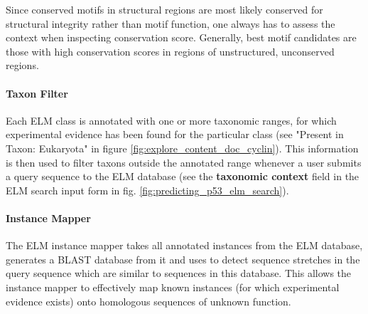 \documentclass[12pt]{article}
\newcommand\button[1]{%
	\textbf{#1}%
}
\begin{document}
Since conserved motifs in structural regions are most likely conserved for
structural integrity rather than motif function, one always has to assess the
context when inspecting conservation score. Generally, best motif candidates
are those with high conservation scores in regions of unstructured, unconserved
regions.

%

\paragraph*{Taxon Filter}\label{TaxonFilter}

Each ELM class is annotated with one or more taxonomic ranges, for which
experimental evidence has been found for the particular class
(see "Present in Taxon: Eukaryota" in figure
\ref{fig:explore_content_doc_cyclin}). This information is then used to filter taxons
outside the annotated range whenever a user submits a query sequence to the ELM
database (see the \button{taxonomic context} field in the ELM search input form in fig.
\ref{fig:predicting_p53_elm_search}).

\paragraph*{Instance Mapper}\label{InstanceMapper}

The ELM instance mapper takes all annotated instances from the ELM database,
generates a BLAST database from it and uses  to detect sequence stretches in
the query sequence which are similar to sequences in this database. This allows
the instance mapper to effectively map known instances (for which experimental
evidence exists) onto homologous sequences of unknown function.

\end{document}
